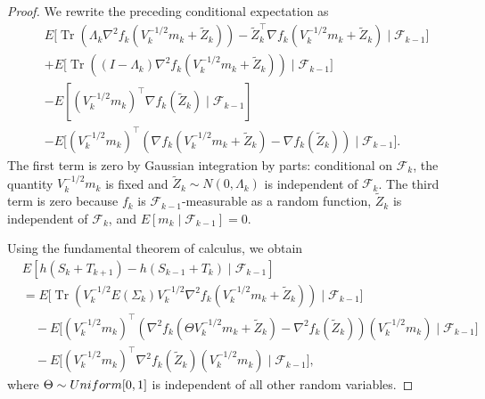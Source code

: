 \documentclass[10pt,a4paper]{amsart}
\begin{document}
\begin{proof}
We rewrite the preceding conditional expectation as
\begin{align*}
& E\biggl[
\operatorname{Tr}\left(
\Lambda_k
\nabla^2 f_k\left(V_k^{-1/2}m_k+\widetilde Z_k\right)
\right)
-
\widetilde Z_k^\top
\nabla f_k\left(V_k^{-1/2}m_k+\widetilde Z_k\right)
\mid
\mathcal F_{k-1}
\biggr]
\\
&+
E\biggl[
\operatorname{Tr}\left(
(I-\Lambda_k)
\nabla^2 f_k\left(V_k^{-1/2}m_k+\widetilde Z_k\right)
\right)
\mid
\mathcal F_{k-1}
\biggr]
\\
&-
E\left[
(V_k^{-1/2}m_k)^\top\nabla f_k(\widetilde Z_k)
\mid
\mathcal F_{k-1}
\right]
\\
&-
E\biggl[
(V_k^{-1/2}m_k)^\top
\left(
\nabla f_k\left(V_k^{-1/2}m_k+\widetilde Z_k\right)
-
\nabla f_k(\widetilde Z_k)
\right)
\mid
\mathcal F_{k-1}
\biggr].
\end{align*}
The first term is zero by Gaussian integration by parts: conditional on
$\mathcal F_k$, the quantity $V_k^{-1/2}m_k$ is fixed and
$\widetilde Z_k\sim N(0,\Lambda_k)$ is independent of $\mathcal F_k$. The third term is zero because $f_k$ is $\mathcal F_{k-1}$-measurable as a
random function, $\widetilde Z_k$ is independent of $\mathcal F_k$, and
$E[m_k\mid\mathcal F_{k-1}]=0$.

Using the fundamental theorem of calculus, we obtain
\begin{align*}
& E\left[
h(S_k+T_{k+1})-h(S_{k-1}+T_k)
\mid
\mathcal F_{k-1}
\right]
\\
&=
E\biggl[
\operatorname{Tr}\left(
V_k^{-1/2}E(\Sigma_k)V_k^{-1/2}
\nabla^2 f_k\left(V_k^{-1/2}m_k+\widetilde Z_k\right)
\right)
\mid
\mathcal F_{k-1}
\biggr]
\\
&\quad
-
E\biggl[
(V_k^{-1/2}m_k)^\top
\left(
\nabla^2 f_k(\Theta V_k^{-1/2}m_k+\widetilde Z_k)
-
\nabla^2 f_k(\widetilde Z_k)
\right)
(V_k^{-1/2}m_k)
\mid
\mathcal F_{k-1}
\biggr]
\\
&\quad
-
E\biggl[
(V_k^{-1/2}m_k)^\top
\nabla^2 f_k(\widetilde Z_k)
(V_k^{-1/2}m_k)
\mid
\mathcal F_{k-1}
\biggr],
\end{align*}
where \(\Theta\sim {\rm Uniform}[0,1]\) is independent of all other random
variables.


\end{proof}
\end{document}
